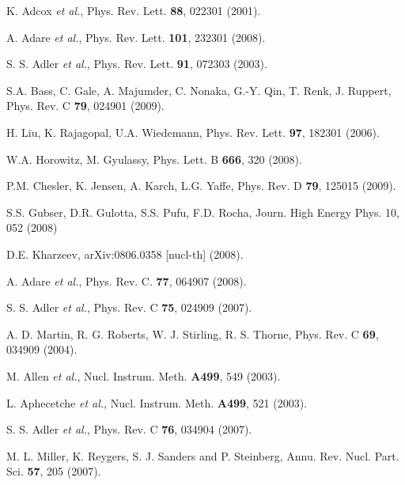\documentclass[aps,prc,superscriptaddress,showpacs,nofootinbib,floatfix,twocolumn]{revtex4}
\begin{document}
\begin{references}

  K. Adcox {\it et al.},
  Phys. Rev. Lett. {\bf 88}, 022301 (2001).

  A. Adare {\it et al.},
  Phys. Rev. Lett. {\bf 101}, 232301 (2008).

  S. S. Adler {\it et al.},
  Phys. Rev. Lett. {\bf 91}, 072303 (2003).

  S.A. Bass, C. Gale, A. Majumder, C. Nonaka, G.-Y. Qin, T. Renk,
  J. Ruppert,
  Phys. Rev. C {\bf 79}, 024901 (2009).

  H. Liu, K. Rajagopal, U.A. Wiedemann,
  Phys. Rev. Lett. {\bf 97}, 182301 (2006).

  W.A. Horowitz, M. Gyulassy,
  Phys. Lett. B {\bf 666}, 320 (2008).

  P.M. Chesler, K. Jensen, A. Karch, L.G. Yaffe,
  Phys. Rev. D {\bf 79}, 125015 (2009).

  S.S. Gubser, D.R. Gulotta, S.S. Pufu, F.D. Rocha,
  Journ. High Energy Phys. 10, 052 (2008)

  D.E. Kharzeev, arXiv:0806.0358 [nucl-th] (2008).

  A. Adare {\it et al.}, 
  Phys. Rev. C. {\bf 77}, 064907 (2008).

  S. S. Adler {\it et al.},
  Phys. Rev. C {\bf 75}, 024909 (2007).

A. D. Martin, R. G. Roberts, W. J. Stirling, R. S. Thorne,
  Phys. Rev. C {\bf 69}, 034909 (2004).

 M. Allen {\it et al.}, 
  Nucl. Instrum. Meth. {\bf A499}, 549 (2003).

 L. Aphecetche {\it et al.}, 
  Nucl. Instrum. Meth. {\bf A499}, 521 (2003).

  S. S. Adler {\it et al.},
  Phys. Rev. C {\bf 76}, 034904 (2007).

  M. L. Miller, K. Reygers, S. J. Sanders and P. Steinberg,
  Annu. Rev. Nucl. Part. Sci. {\bf 57}, 205 (2007).


\end{references}
\end{document}
